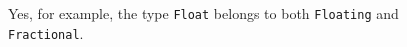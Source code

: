 
Yes, for example, the type \verb|Float| belongs to both \verb|Floating| and \\ 
\verb|Fractional|.
